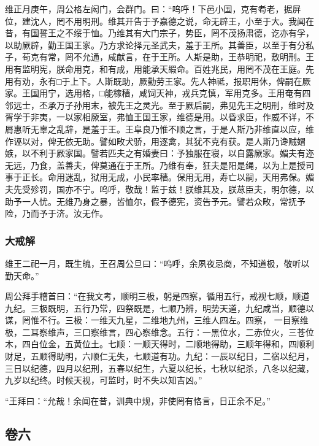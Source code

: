 \documentclass[]{article}
\begin{document}
维正月庚午，周公格左闳门，会群门。曰：``呜呼！下邑小国，克有耇老，据屏位，建沈人，罔不用明刑。维其开告于予嘉德之说，命无辟王，小至于大。我闻在昔，有国誓王之不绥于恤。乃维其有大门宗子，势臣，罔不茂扬肃德，讫亦有孚，以助厥辟，勤王国王家。乃方求论择元圣武夫，羞于王所。其善臣，以至于有分私子，苟克有常，罔不允通，咸献言，在于王所。人斯是助，王恭明祀，敷明刑。王用有监明宪，朕命用克，和有成，用能承天嘏命。百姓兆民，用罔不茂在王庭。先用有劝，永有□于上下。人斯既助，厥勤劳王家。先人神祗，报职用休，俾嗣在厥家。王国用宁，选用格，□能稼穑，咸饲天神，戎兵克慎，军用克多。王用奄有四邻远士，丕承万子孙用末，被先王之灵光。至于厥后嗣，弗见先王之明刑，维时及胥学于非夷，一以家相厥室，弗恤王国王家，维德是用。以昏求臣，作威不详，不屑惠听无辜之乱辞，是羞于王。王阜良乃惟不顺之言，于是人斯乃非维直以应，维作诬以对，俾无依无助。譬如畋犬骄，用逐禽，其犹不克有获。是人斯乃谗贼媢嫉，以不利于厥家国。譬若匹夫之有婚妻曰：予独服在寝，以自露厥家。媚夫有迩无远，乃食，盖善夫，俾莫通在于王所。乃维有奉，狂夫是阳是绳，以为上是授司事于正长。命用迷乱，狱用无成，小民率穑。保用无用，寿亡以嗣，天用弗保。媚夫先受殄罚，国亦不宁。呜呼，敬哉！监于兹！朕维其及，朕荩臣夫，明尔德，以助予一人忧。无维乃身之暴，皆恤尔，假予德宪，资告予元。譬若众畋，常抚予险，乃而予于济。汝无作。

\hypertarget{header-n263}{%
\subsubsection{大戒解}\label{header-n263}}

维王二祀一月，既生魄，王召周公旦曰：``呜呼，余夙夜忌商，不知道极，敬听以勤天命。''

周公拜手稽首曰：``在我文考，顺明三极，躬是四察，循用五行，戒视七顺，顺道九纪。三极既明，五行乃常，四祭既是，七顺乃辨，明势天道，九纪咸当，顺德以谋，罔惟不行。三极：一维天九星，二维地九州，三维人四左。四察，
一目察维极，二耳察维声，三口察维言，四心察维念。五行：一黑位水，二赤位火，三苍位木，四白位金，五黄位土。七顺：一顺天得时，二顺地得助，三顺年得和，四顺利财足，五顺得助明，六顺仁无失，七顺道有功。九纪：一辰以纪日，二宿以纪月，三日以纪德，四月以纪刑，五春以纪生，六夏以纪长，七秋以纪杀，八冬以纪藏，九岁以纪终。时候天视，可监时，时不失以知吉凶。''

``王拜曰：``允哉！余闻在昔，训典中规，非使罔有恪言，日正余不足。''

\hypertarget{header-n271}{%
\subsection{卷六}\label{header-n271}}
\end{document}

